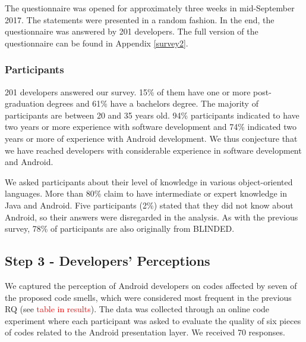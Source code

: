 
The questionnaire was opened for approximately three weeks in mid-September 2017. The statements were presented in a random fashion. In the end, the questionnaire was answered by 201 developers. The full version of the questionnaire can be found in Appendix \ref{survey2}.


\subsubsection{Participants}
\label{etapa-2-participantes}

201 developers answered our survey. 15\% of them have one or more post-graduation degrees and 61\% have a bachelors degree. The majority of participants are between 20 and 35 years old.
94\% participants indicated to have two years or more experience with software development and 74\% indicated two years or more of experience with Android development. We thus conjecture that we have reached developers with considerable experience in software development and Android.


We asked participants about their level of knowledge in various object-oriented languages. More than 80\% claim to have intermediate or expert knowledge in Java and Android. Five participants (2\%) stated that they did not know about Android, so their answers were disregarded in the analysis.
As with the previous survey, 78\% of participants are also originally from BLINDED. 


\subsection{Step 3 - Developers' Perceptions}
\label{etapa-3}


We captured the perception of Android developers on codes affected by seven of the proposed code smells, which were considered most frequent in the previous RQ (see \textcolor{red}{table in results}). The data was collected through an online code experiment where each participant was asked to evaluate the quality of six pieces of codes related to the Android presentation layer. We received 70 responses. 

